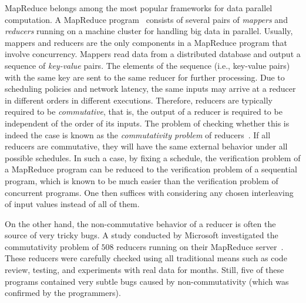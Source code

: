 \documentclass{llncs}
\begin{document}
MapReduce belongs among the most popular frameworks for data parallel
computation. A MapReduce program~\cite{dean04} consists of several pairs
of \emph{mappers} and \emph{reducers} running on a machine cluster for handling
big data in parallel. Usually, mappers and reducers are the only components in a
MapReduce program that involve concurrency. Mappers read data from a distributed
database and output a sequence of \emph{key-value} pairs. The elements of the
sequence (i.e., key-value pairs) with the same key are sent to the same reducer
for further processing. Due to scheduling policies and network latency, the same
inputs may arrive at a reducer in different orders in different executions.
Therefore, reducers are typically required to be \emph{commutative}, that is,
the output of a reducer is required to be independent of the order of its
inputs. The problem of checking whether this is indeed the case is known as the
\emph{commutativity problem} of
reducers~\cite{csallner13testing,xiao14mr,ChenHSW15,ChenSW16}. If all reducers
are commutative, they will have the same external behavior under all possible
schedules. In such a case, by fixing a schedule, the verification problem of a
MapReduce program can be reduced to the verification problem of a sequential
program, which is known to be much easier than the verification problem of
concurrent programs. One then suffices with considering any chosen interleaving
of input values instead of all of them.


On the other hand, the non-commutative behavior of a reducer is often the source
of very tricky bugs. A study conducted by Microsoft investigated the
commutativity problem of $508$ reducers running on their MapReduce
server~\cite{xiao14mr}. These reducers were carefully checked using all
traditional means such as code review, testing, and experiments with real data
for months. Still, five of these programs contained very subtle bugs caused by
non-commutativity (which was confirmed by the programmers).
\end{document}
